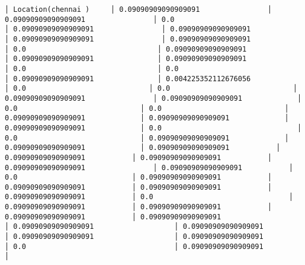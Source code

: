 \documentclass[11pt]{article}
\begin{document}
\begin{Verbatim}[commandchars=\\\{\}]
│ Location(chennai )     │ 0.09090909090909091                │ 0.09090909090909091                │ 0.0                                │ 0.09090909090909091                │ 0.09090909090909091                │ 0.09090909090909091                │ 0.09090909090909091                │ 0.0                               │ 0.09090909090909091               │ 0.09090909090909091               │ 0.09090909090909091                │ 0.0                               │ 0.0                               │ 0.09090909090909091               │ 0.004225352112676056            │ 0.0                             │ 0.0                             │ 0.09090909090909091                │ 0.09090909090909091             │ 0.0                             │ 0.0                             │ 0.09090909090909091             │ 0.09090909090909091             │ 0.09090909090909091             │ 0.0                                │ 0.0                             │ 0.09090909090909091             │ 0.09090909090909091             │ 0.09090909090909091           │ 0.09090909090909091           │ 0.09090909090909091           │ 0.09090909090909091                │ 0.09090909090909091           │ 0.0                           │ 0.09090909090909091           │ 0.09090909090909091           │ 0.09090909090909091           │ 0.09090909090909091           │ 0.0                                │ 0.09090909090909091           │ 0.09090909090909091           │ 0.09090909090909091           │ 0.09090909090909091                   │ 0.09090909090909091                   │ 0.09090909090909091                   │ 0.09090909090909091                   │ 0.09090909090909091                   │ 0.0                                   │ 0.09090909090909091                   │

\end{Verbatim}
\end{document}
